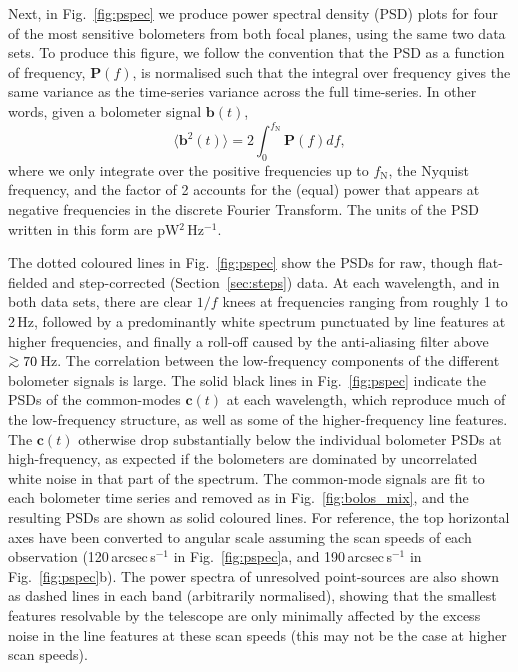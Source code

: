 \documentclass[useAMS,usenatbib,nofootinbib]{mn2e}
\def\gsim{\mathrel{\lower2.5pt\vbox{\lineskip=0pt\baselineskip=0pt
          \hbox{$>$}\hbox{$\sim$}}}}
\begin{document}
Next, in Fig.~\ref{fig:pspec} we produce power spectral density (PSD)
plots for four of the most sensitive bolometers from both focal
planes, using the same two data sets. To produce this figure, we
follow the convention that the PSD as a function of frequency,
$\mathbf{P}(f)$, is normalised such that the integral over frequency
gives the same variance as the time-series variance across the full
time-series. In other words, given a bolometer signal $\mathbf{b}(t)$,
%
\begin{equation}
\label{eq:psd}
\langle\mathbf{b}^2(t)\rangle = 2 \int_0^{f_\mathrm{N}} \mathbf{P}(f)
df ,
\end{equation}
%
where we only integrate over the positive frequencies up to
$f_\mathrm{N}$, the Nyquist frequency, and the factor of 2 accounts
for the (equal) power that appears at negative frequencies in the
discrete Fourier Transform. The units of the PSD written in this form
are pW$^2$\,Hz$^{-1}$.

The dotted coloured lines in Fig.~\ref{fig:pspec} show the PSDs for
raw, though flat-fielded and step-corrected (Section~\ref{sec:steps})
data. At each wavelength, and in both data sets, there are clear $1/f$
knees at frequencies ranging from roughly 1 to 2\,Hz, followed by a
predominantly white spectrum punctuated by line features at higher
frequencies, and finally a roll-off caused by the anti-aliasing filter
above $\gsim 70$\,Hz. The correlation between the low-frequency
components of the different bolometer signals is large. The solid
black lines in Fig.~\ref{fig:pspec} indicate the PSDs of the
common-modes $\mathbf{c}(t)$ at each wavelength, which reproduce much
of the low-frequency structure, as well as some of the
higher-frequency line features. The $\mathbf{c}(t)$ otherwise drop
substantially below the individual bolometer PSDs at high-frequency,
as expected if the bolometers are dominated by uncorrelated white
noise in that part of the spectrum. The common-mode signals are fit to
each bolometer time series and removed as in Fig.~\ref{fig:bolos_mix},
and the resulting PSDs are shown as solid coloured lines.  For
reference, the top horizontal axes have been converted to angular
scale assuming the scan speeds of each observation
(120\,arcsec\,s$^{-1}$ in Fig.~\ref{fig:pspec}a, and
190\,arcsec\,s$^{-1}$ in Fig.~\ref{fig:pspec}b). The power spectra of
unresolved point-sources are also shown as dashed lines in each band
(arbitrarily normalised), showing that the smallest features
resolvable by the telescope are only minimally affected by the excess
noise in the line features at these scan speeds (this may not be the
case at higher scan speeds).
\end{document}
